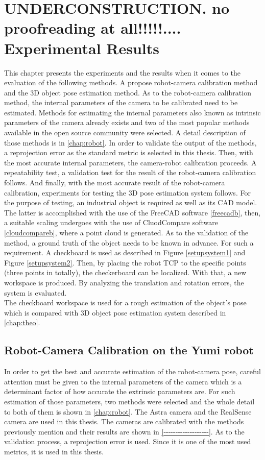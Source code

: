 
\chapter{UNDERCONSTRUCTION. no proofreading at all!!!!!....   Experimental Results}
\label{chap:exp}

This chapter presents the experiments and the results when it comes to the evaluation of the following methods. A propose robot-camera calibration method and the 3D object pose estimation method. As to the robot-camera calibration method, the internal parameters of the camera to be calibrated need to be estimated. Methods for estimating the internal parameters also known as intrinsic parameters of the camera already exists and two of the most popular methods available in the open source community were selected. A detail description of those methods is in \ref{chap:robot}. In order to validate the output of the methods, a reprojection error as the standard metric is selected in this thesis. Then, with the most accurate internal parameters, the camera-robot calibration proceeds. A repeatability test, a validation test for the result of the robot-camera calibration follows. And finally, with the most accurate result of the robot-camera calibration, experiments for testing the 3D pose estimation system follows. For the purpose of testing, an industrial object is required as well as its CAD model. The latter is accomplished with the use of the FreeCAD software \ref{freecadb}, then, a suitable scaling undergoes with the use of CluodCompare software \ref{cloudcompareb}, where a point cloud is generated. As to the validation of the method, a ground truth of the object needs to be known in advance. For such a requirement. A checkboard is used as described in Figure \ref{setupsystem1} and Figure \ref{setupsystem2}. Then, by placing the robot TCP to the specific points (three points in totally), the checkerboard can be localized. With that, a new workspace is produced. By analyzing the translation and rotation errors, the system is evaluated.\\
The checkboard workspace is used for a rough estimation of the object's pose which is compared with 3D object pose estimation system described in \ref{chap:theo}.  


\section{Robot-Camera Calibration on the Yumi robot}
In order to get the best and accurate estimation of the robot-camera pose, careful attention must be given to the internal parameters of the camera which is a determinant factor of how accurate the extrinsic parameters are. For such estimation of those parameters, two methods were selected and the whole detail to both of them is shown in \ref{chap:robot}. The Astra camera and the RealSense camera are used in this thesis.  The cameras are calibrated with the methods previously mention and their results are shown in \ref{-------------------}. As to the validation process, a reprojection error is used. Since it is one of the most used metrics,  it is used in this thesis. 


